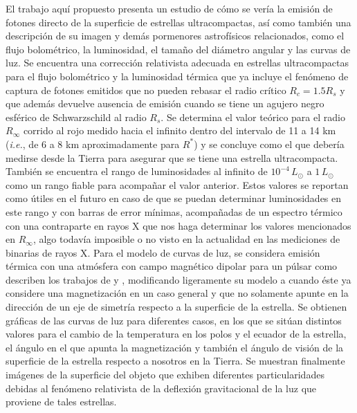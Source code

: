 \documentclass[12pt, letterpaper]{elegantbook}
\begin{document}
El trabajo aquí propuesto presenta un estudio de cómo se vería la emisión de fotones directo de la superficie de
estrellas ultracompactas, así como también una descripción de su imagen y demás pormenores astrofísicos relacionados, como el flujo bolométrico, la luminosidad, el tamaño del diámetro angular y las curvas de luz. Se encuentra una corrección relativista adecuada en estrellas ultracompactas para el flujo bolométrico y la luminosidad térmica que ya incluye el fenómeno de captura de fotones emitidos que no pueden rebasar el radio crítico $R_c=1.5R_s$ y que además devuelve ausencia de emisión cuando se tiene un agujero negro esférico de Schwarzschild al radio $R_s$. Se determina el valor teórico para el radio $R_\infty$ corrido al rojo medido hacia el infinito dentro del intervalo de 11 a 14 km (\textit{i.e.}, de 6 a 8 km aproximadamente para $R^*$) y se concluye como el que debería medirse desde la Tierra para asegurar que se tiene una estrella ultracompacta. También se encuentra el rango de luminosidades al infinito de $10^{-4}\,L_\odot$ a $1\,L_\odot$ como un rango fiable para acompañar el valor anterior. Estos valores se reportan como útiles en el futuro en caso de que se puedan determinar luminosidades en este rango y con barras de error mínimas, acompañadas de un espectro térmico con una contraparte en rayos X que nos haga determinar los valores mencionados en $R_\infty$, algo todavía imposible o no visto en la actualidad en las mediciones de binarias de rayos X. Para el modelo de curvas de luz, se considera emisión térmica con una atmósfera con campo magnético dipolar para un púlsar como describen los trabajos de \cite{1983ApJ...271..283G} y \cite{1995ApJ...442..273P}, modificando ligeramente su modelo a cuando éste ya considere una magnetización en un caso general y que no solamente apunte en la dirección de un eje de simetría respecto a la superficie de la estrella. Se obtienen gráficas de las curvas de luz para diferentes casos, en los que se sitúan distintos valores para el cambio de la temperatura en los polos y el ecuador de la estrella, el ángulo en el que apunta la magnetización y también el ángulo de visión de la superficie de la estrella respecto a nosotros en la Tierra. Se muestran finalmente imágenes de la superficie del objeto que exhiben diferentes particularidades debidas al fenómeno relativista de la deflexión gravitacional de la luz que proviene de tales estrellas. 


%



\printbibliography[heading=bibintoc]
\end{document}
